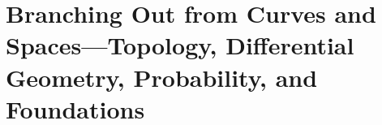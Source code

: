 \documentclass[11pt,openany,fontset=none]{ctexbook}
\theoremstyle{definition}
\theoremstyle{plain}
\theoremstyle{remark}
\begin{document}
\part{Branching Out from Curves and Spaces---Topology, Differential Geometry, Probability, and Foundations}






\appendix





\end{document}
